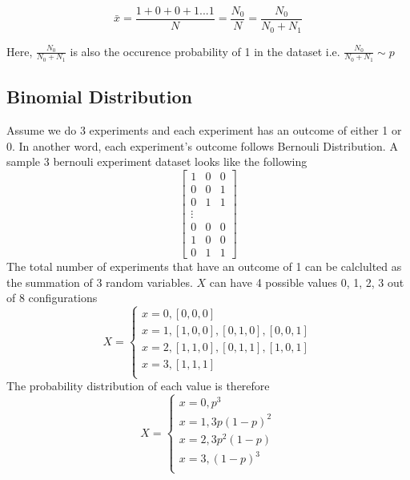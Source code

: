 \documentclass[12pt, oneside]{article}
\begin{document}
$$\bar{x}=\frac{1+0+0+1...1}{N}=\frac{N_0}{N}=\frac{N_0}{N_0+N_1}$$

Here,
$\frac{N_0}{N_0+N_1}$ is also the occurence probability of 1 in the dataset i.e. $\frac{N_0}{N_0+N_1}\sim p$

\subsection{Binomial Distribution}
Assume we do 3 experiments and each experiment has an outcome of either 1 or 0. In another word, each experiment's outcome follows Bernouli Distribution. A sample 3 bernouli experiment dataset looks like the following
\[
\begin{bmatrix}
    1 & 0  &0 \\
    0 & 0  &1 \\
    0 & 1  &1 \\
    \vdots \\
    0 &0  &0\\
    1 & 0  &0 \\
    0 &1  &1
\end{bmatrix}
\]
The total number of experiments that have an outcome of 1 can be calclulted as the summation of 3 random variables. 
$X$ can have 4 possible values 0, 1, 2, 3 out of 8 configurations
\begin{equation*}
X=
\begin{cases}
x=0, [0, 0, 0]\\
x=1, [1, 0, 0], [0, 1, 0], [0, 0, 1]\\
x=2, [1, 1, 0], [0, 1, 1], [1, 0, 1]\\
x=3, [1, 1, 1]\\
\end{cases}
\end{equation*}
The probability distribution of each value is therefore
\begin{equation*}
X=
\begin{cases}
x=0, p^3\\
x=1, 3p(1-p)^2\\
x=2, 3p^2(1-p)\\
x=3, (1-p)^3\\
\end{cases}
\end{equation*}
\end{document}
